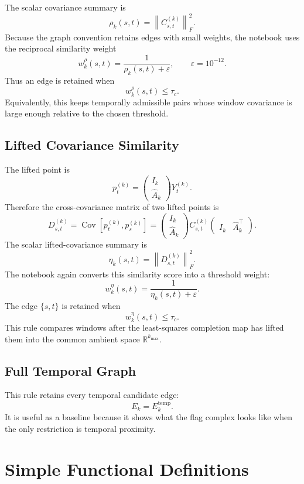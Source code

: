 \documentclass[11pt]{article}
\newcommand{\R}{\mathbb{R}}
\newcommand{\frob}[1]{\left\lVert #1 \right\rVert_F}
\begin{document}
The scalar covariance summary is
\[
  \rho_k(s,t)=\frob{C_{s,t}^{(k)}}^2.
\]
Because the graph convention retains edges with small weights, the notebook
uses the reciprocal similarity weight
\[
  w_k^\rho(s,t)=\frac{1}{\rho_k(s,t)+\varepsilon},
  \qquad \varepsilon=10^{-12}.
\]
Thus an edge is retained when
\[
  w_k^\rho(s,t)\leq \tau_c.
\]
Equivalently, this keeps temporally admissible pairs whose window covariance is
large enough relative to the chosen threshold.

\subsection{Lifted Covariance Similarity}

The lifted point is
\[
  p_t^{(k)}
  =
  \begin{pmatrix}
    I_k\\
    \widehat A_k
  \end{pmatrix}
  Y_t^{(k)}.
\]
Therefore the cross-covariance matrix of two lifted points is
\[
  D_{s,t}^{(k)}
  =
  \operatorname{Cov}\!\left[p_t^{(k)},p_s^{(k)}\right]
  =
  \begin{pmatrix}
    I_k\\
    \widehat A_k
  \end{pmatrix}
  C_{s,t}^{(k)}
  \begin{pmatrix}
    I_k & \widehat A_k^\top
  \end{pmatrix}.
\]
The scalar lifted-covariance summary is
\[
  \eta_k(s,t)=\frob{D_{s,t}^{(k)}}^2.
\]
The notebook again converts this similarity score into a threshold weight:
\[
  w_k^\eta(s,t)=\frac{1}{\eta_k(s,t)+\varepsilon}.
\]
The edge \(\{s,t\}\) is retained when
\[
  w_k^\eta(s,t)\leq \tau_c.
\]
This rule compares windows after the least-squares completion map has lifted
them into the common ambient space \(\R^{k_{\max}}\).

\subsection{Full Temporal Graph}

This rule retains every temporal candidate edge:
\[
  E_k = E_k^{\mathrm{temp}}.
\]
It is useful as a baseline because it shows what the flag complex looks like
when the only restriction is temporal proximity.

\section{Simple Functional Definitions}
\end{document}
